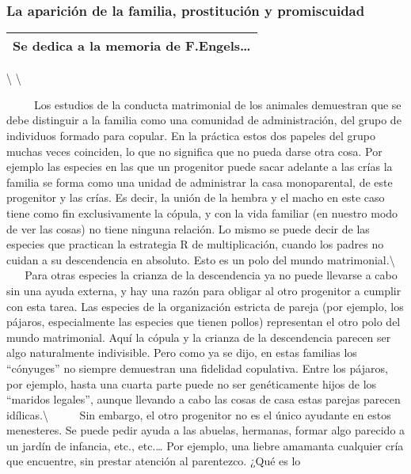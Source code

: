 \subsubsection{La aparición de la familia, prostitución y
promiscuidad}\label{la-apariciuxf3n-de-la-familia-prostituciuxf3n-y-promiscuidad}

\begin{longtable}[]{@{}l@{}}
\toprule
Se dedica a la memoria de F.Engels\ldots{}\tabularnewline
\bottomrule
\end{longtable}

\textbackslash{} \textbackslash{}

~ ~ ~ Los estudios de la conducta matrimonial de los animales demuestran
que se debe distinguir a la familia como una comunidad de
administración, del grupo de individuos formado para copular. En la
práctica estos dos papeles del grupo muchas veces coinciden, lo que no
significa que no pueda darse otra cosa. Por ejemplo las especies en las
que un progenitor puede sacar adelante a las crías la familia se forma
como una unidad de administrar la casa monoparental, de este progenitor
y las crías. Es decir, la unión de la hembra y el macho en este caso
tiene como fin exclusivamente la cópula, y con la vida familiar (en
nuestro modo de ver las cosas) no tiene ninguna relación. Lo mismo se
puede decir de las especies que practican la estrategia R de
multiplicación, cuando los padres no cuidan a su descendencia en
absoluto. Esto es un polo del mundo matrimonial.\textbackslash{} ~ ~ ~
Para otras especies la crianza de la descendencia ya no puede llevarse a
cabo sin una ayuda externa, y hay una razón para obligar al otro
progenitor a cumplir con esta tarea. Las especies de la organización
estricta de pareja (por ejemplo, los pájaros, especialmente las especies
que tienen pollos) representan el otro polo del mundo matrimonial. Aquí
la cópula y la crianza de la descendencia parecen ser algo naturalmente
indivisible. Pero como ya se dijo, en estas familias los ``cónyuges'' no
siempre demuestran una fidelidad copulativa. Entre los pájaros, por
ejemplo, hasta una cuarta parte puede no ser genéticamente hijos de los
``maridos legales'', aunque llevando a cabo las cosas de casa estas
parejas parecen idílicas.\textbackslash{} ~ ~ ~ Sin embargo, el otro
progenitor no es el único ayudante en estos menesteres. Se puede pedir
ayuda a las abuelas, hermanas, formar algo parecido a un jardín de
infancia, etc., etc.\ldots{} Por ejemplo, una liebre amamanta cualquier
cría que encuentre, sin prestar atención al parentezco. ¿Qué es lo
